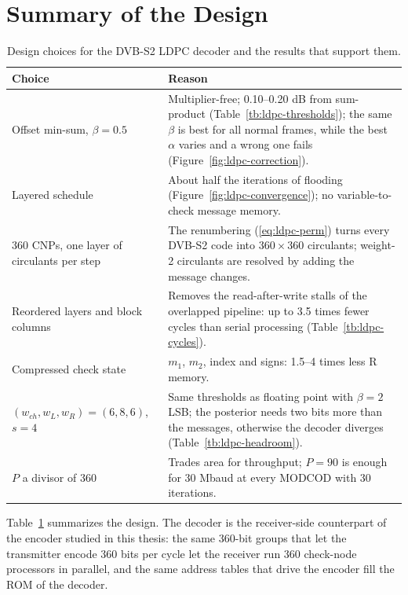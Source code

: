 \section{Summary of the Design}

\begin{table} \centering
\begin{tabular}{|p{4cm}|p{9cm}|}
\hline
Choice & Reason \\
\hline
Offset min-sum, \(\beta = 0.5\) & Multiplier-free; 0.10--0.20 dB from sum-product (Table~\ref{tb:ldpc-thresholds}); the same \(\beta\) is best for all normal frames, while the best \(\alpha\) varies and a wrong one fails (Figure~\ref{fig:ldpc-correction}). \\
Layered schedule & About half the iterations of flooding (Figure~\ref{fig:ldpc-convergence}); no variable-to-check message memory. \\
360 CNPs, one layer of circulants per step & The renumbering (\ref{eq:ldpc-perm}) turns every DVB-S2 code into \(360 \times 360\) circulants; weight-2 circulants are resolved by adding the message changes. \\
Reordered layers and block columns & Removes the read-after-write stalls of the overlapped pipeline: up to 3.5 times fewer cycles than serial processing (Table~\ref{tb:ldpc-cycles}). \\
Compressed check state & \(m_1\), \(m_2\), index and signs: 1.5--4 times less R memory. \\
\((w_{ch}, w_L, w_R) = (6, 8, 6)\), \(s = 4\) & Same thresholds as floating point with \(\beta = 2\) LSB; the posterior needs two bits more than the messages, otherwise the decoder diverges (Table~\ref{tb:ldpc-headroom}). \\
\(P\) a divisor of 360 & Trades area for throughput; \(P = 90\) is enough for 30 Mbaud at every MODCOD with 30 iterations. \\
\hline
\end{tabular}
\caption{Design choices for the DVB-S2 LDPC decoder and the results that support them.} \label{tb:ldpc-summary}
\end{table}

Table~\ref{tb:ldpc-summary} summarizes the design. The decoder is the receiver-side counterpart of the encoder studied in this thesis: the same 360-bit groups that let the transmitter encode 360 bits per cycle let the receiver run 360 check-node processors in parallel, and the same address tables that drive the encoder fill the ROM of the decoder.
